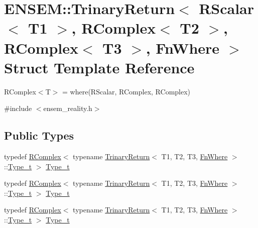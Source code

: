 \hypertarget{structENSEM_1_1TrinaryReturn_3_01RScalar_3_01T1_01_4_00_01RComplex_3_01T2_01_4_00_01RComplex_3_01T3_01_4_00_01FnWhere_01_4}{}\section{E\+N\+S\+EM\+:\+:Trinary\+Return$<$ R\+Scalar$<$ T1 $>$, R\+Complex$<$ T2 $>$, R\+Complex$<$ T3 $>$, Fn\+Where $>$ Struct Template Reference}
\label{structENSEM_1_1TrinaryReturn_3_01RScalar_3_01T1_01_4_00_01RComplex_3_01T2_01_4_00_01RComplex_3_01T3_01_4_00_01FnWhere_01_4}


R\+Complex$<$\+T$>$ = where(\+R\+Scalar, R\+Complex, R\+Complex)  




{\ttfamily \#include $<$ensem\+\_\+reality.\+h$>$}

\subsection*{Public Types}
\begin{DoxyCompactItemize}
\item 
typedef \mbox{\hyperlink{classENSEM_1_1RComplex}{R\+Complex}}$<$ typename \mbox{\hyperlink{structENSEM_1_1TrinaryReturn}{Trinary\+Return}}$<$ T1, T2, T3, \mbox{\hyperlink{structENSEM_1_1FnWhere}{Fn\+Where}} $>$\+::\mbox{\hyperlink{structENSEM_1_1TrinaryReturn_3_01RScalar_3_01T1_01_4_00_01RComplex_3_01T2_01_4_00_01RComplex_3_01T3_01_4_00_01FnWhere_01_4_a0ff54f19b5e93daa3871e94f3d83b657}{Type\+\_\+t}} $>$ \mbox{\hyperlink{structENSEM_1_1TrinaryReturn_3_01RScalar_3_01T1_01_4_00_01RComplex_3_01T2_01_4_00_01RComplex_3_01T3_01_4_00_01FnWhere_01_4_a0ff54f19b5e93daa3871e94f3d83b657}{Type\+\_\+t}}
\item 
typedef \mbox{\hyperlink{classENSEM_1_1RComplex}{R\+Complex}}$<$ typename \mbox{\hyperlink{structENSEM_1_1TrinaryReturn}{Trinary\+Return}}$<$ T1, T2, T3, \mbox{\hyperlink{structENSEM_1_1FnWhere}{Fn\+Where}} $>$\+::\mbox{\hyperlink{structENSEM_1_1TrinaryReturn_3_01RScalar_3_01T1_01_4_00_01RComplex_3_01T2_01_4_00_01RComplex_3_01T3_01_4_00_01FnWhere_01_4_a0ff54f19b5e93daa3871e94f3d83b657}{Type\+\_\+t}} $>$ \mbox{\hyperlink{structENSEM_1_1TrinaryReturn_3_01RScalar_3_01T1_01_4_00_01RComplex_3_01T2_01_4_00_01RComplex_3_01T3_01_4_00_01FnWhere_01_4_a0ff54f19b5e93daa3871e94f3d83b657}{Type\+\_\+t}}
\item 
typedef \mbox{\hyperlink{classENSEM_1_1RComplex}{R\+Complex}}$<$ typename \mbox{\hyperlink{structENSEM_1_1TrinaryReturn}{Trinary\+Return}}$<$ T1, T2, T3, \mbox{\hyperlink{structENSEM_1_1FnWhere}{Fn\+Where}} $>$\+::\mbox{\hyperlink{structENSEM_1_1TrinaryReturn_3_01RScalar_3_01T1_01_4_00_01RComplex_3_01T2_01_4_00_01RComplex_3_01T3_01_4_00_01FnWhere_01_4_a0ff54f19b5e93daa3871e94f3d83b657}{Type\+\_\+t}} $>$ \mbox{\hyperlink{structENSEM_1_1TrinaryReturn_3_01RScalar_3_01T1_01_4_00_01RComplex_3_01T2_01_4_00_01RComplex_3_01T3_01_4_00_01FnWhere_01_4_a0ff54f19b5e93daa3871e94f3d83b657}{Type\+\_\+t}}
\end{DoxyCompactItemize}



